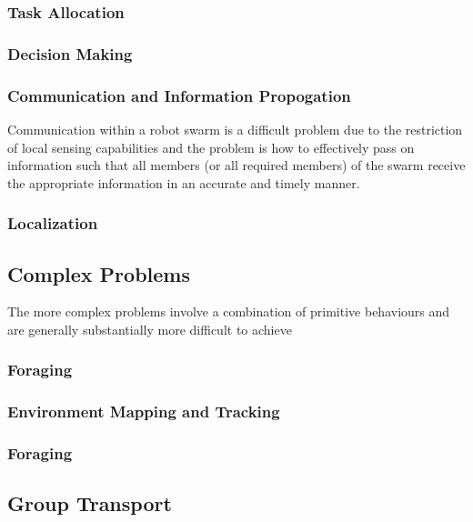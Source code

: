 \subsubsection{Task Allocation}

\subsubsection{Decision Making}

\subsubsection{Communication and Information Propogation}
Communication within a robot swarm is a difficult problem due to the restriction of local sensing capabilities and the problem is how to effectively pass on information such that all members (or all required members) of the swarm receive the appropriate information in an accurate and timely manner.

\subsubsection{Localization}

\subsection{Complex Problems}
The more complex problems involve a combination of primitive behaviours and are generally substantially more difficult to achieve


\subsubsection{Foraging}
\subsubsection{Environment Mapping and Tracking}



\subsubsection{Foraging}
\subsection{Group Transport}

